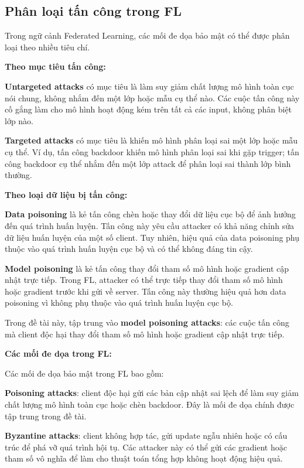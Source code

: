 \subsection{Phân loại tấn công trong FL}
Trong ngữ cảnh Federated Learning, các mối đe dọa bảo mật có thể được phân loại theo nhiều tiêu chí.

\textbf{Theo mục tiêu tấn công:}

\textbf{Untargeted attacks} có mục tiêu là làm suy giảm chất lượng mô hình toàn cục nói chung, không nhắm đến một lớp hoặc mẫu cụ thể nào. Các cuộc tấn công này cố gắng làm cho mô hình hoạt động kém trên tất cả các input, không phân biệt lớp nào.

\textbf{Targeted attacks} có mục tiêu là khiến mô hình phân loại sai một lớp hoặc mẫu cụ thể. Ví dụ, tấn công backdoor khiến mô hình phân loại sai khi gặp trigger; tấn công backdoor cụ thể nhắm đến một lớp attack để phân loại sai thành lớp bình thường.

\textbf{Theo loại dữ liệu bị tấn công:}

\textbf{Data poisoning} là kẻ tấn công chèn hoặc thay đổi dữ liệu cục bộ để ảnh hưởng đến quá trình huấn luyện. Tấn công này yêu cầu attacker có khả năng chỉnh sửa dữ liệu huấn luyện của một số client. Tuy nhiên, hiệu quả của data poisoning phụ thuộc vào quá trình huấn luyện cục bộ và có thể không đáng tin cậy.

\textbf{Model poisoning} là kẻ tấn công thay đổi tham số mô hình hoặc gradient cập nhật trực tiếp. Trong FL, attacker có thể trực tiếp thay đổi tham số mô hình hoặc gradient trước khi gửi về server. Tấn công này thường hiệu quả hơn data poisoning vì không phụ thuộc vào quá trình huấn luyện cục bộ.

Trong đề tài này, tập trung vào \textbf{model poisoning attacks}: các cuộc tấn công mà client độc hại thay đổi tham số mô hình hoặc gradient cập nhật trực tiếp.

\textbf{Các mối đe dọa trong FL:}

Các mối đe dọa bảo mật trong FL bao gồm:

\textbf{Poisoning attacks}: client độc hại gửi các bản cập nhật sai lệch để làm suy giảm chất lượng mô hình toàn cục hoặc chèn backdoor. Đây là mối đe dọa chính được tập trung trong đề tài.

\textbf{Byzantine attacks}: client không hợp tác, gửi update ngẫu nhiên hoặc có cấu trúc để phá vỡ quá trình hội tụ. Các attacker này có thể gửi các gradient hoặc tham số vô nghĩa để làm cho thuật toán tổng hợp không hoạt động hiệu quả.


